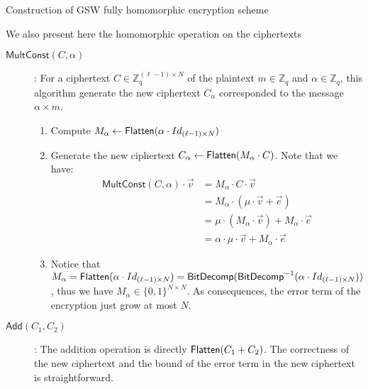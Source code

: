 \begin{section}{Construction of GSW fully homomorphic encryption scheme}
  
  We also present here the homomorphic operation on the ciphertexts
  \begin{description}
  \item[${\mathsf{MultConst}}(C, \alpha)$]: For a ciphertext $C \in \mathbb{Z}_q^{(\ell-1)\times N}$ of the plaintext $m \in \mathbb{Z}_q$ and $\alpha \in \mathbb{Z}_q$, this algorithm generate the new ciphertext $C_\alpha$ corresponded to the message $\alpha \times m$.
    \begin{enumerate}
    \item Compute $M_\alpha \gets {\mathsf{Flatten}}(\alpha \cdot Id_{(\ell-1) \times N})$
    \item Generate the new ciphertext $C_\alpha \gets {\mathsf{Flatten}}(M_\alpha \cdot C)$. Note that we have:\
      \begin{align*}
        {\mathsf{MultConst}(C, \alpha)} \cdot \vec{v} &= M_\alpha \cdot C \cdot \vec{v}\\
                                                      &= M_\alpha \cdot (\mu \cdot \vec{v} + \vec{e})\\
                                                      &= \mu \cdot (M_\alpha \cdot \vec{v}) + M_\alpha \cdot \vec{e}\\
                                                      &= \alpha \cdot \mu \cdot \vec{v} + M_\alpha \cdot \vec{e}
      \end{align*}
    \item Notice that $M_\alpha = {\mathsf{Flatten}}(\alpha \cdot Id_{(\ell-1) \times N}) = {\mathsf{BitDecomp}}({\mathsf{BitDecomp}}^{-1}(\alpha \cdot Id_{(\ell-1) \times N}))$, thus we have $M_\alpha \in \{0,1\}^{N \times N}$. As consequences, the error term of the encryption just grow at most $N$.
    \end{enumerate}

  \item[${\mathsf{Add}}(C_1, C_2)$]:
    The addition operation is directly ${\mathsf{Flatten}}(C_1 + C_2)$. The correctness of the new ciphertext and the bound of the error term in the new ciphertext is straightforward.
  \end{description}

\end{section}